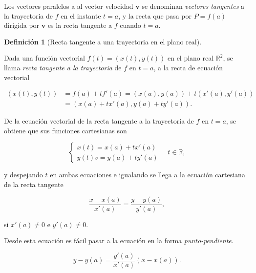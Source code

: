 \documentclass[
  a4paper,
]{scrreport}
\theoremstyle{definition}
\theoremstyle{plain}
\theoremstyle{plain}
\theoremstyle{plain}
\theoremstyle{definition}
\newtheorem{definition}{Definición}[chapter]
\theoremstyle{remark}
\begin{document}
Los vectores paralelos a al vector velocidad \(\mathbf{v}\) se denominan
\emph{vectores tangentes} a la trayectoria de \(f\) en el instante
\(t=a\), y la recta que pasa por \(P=f(a)\) dirigida por \(\mathbf{v}\)
es la recta tangente a \(f\) cuando \(t=a\).

\begin{definition}[Recta tangente a una trayectoria en el plano
real]\protect\hypertarget{def-tangente-trayectoria-plano}{}\label{def-tangente-trayectoria-plano}

Dada una función vectorial \(f(t)=(x(t),y(t))\) en el plano real
\(\mathbb{R}^2\), se llama \emph{recta tangente a la trayectoria} de
\(f\) en \(t=a\), a la recta de ecuación vectorial

\begin{align*}
(x(t),y(t)) 
&= f(a)+tf'(a) = (x(a),y(a))+t(x'(a),y'(a)) \\
& = (x(a)+tx'(a),y(a)+ty'(a)).
\end{align*}

\end{definition}

De la ecuación vectorial de la recta tangente a la trayectoria de \(f\)
en \(t=a\), se obtiene que sus funciones cartesianas son

\[
\begin{cases}
x(t) = x(a) + tx'(a) \\
y(t)v= y(a) + ty'(a) 
\end{cases}
\quad t\in \mathbb{R},
\]

y despejando \(t\) en ambas ecuaciones e igualando se llega a la
ecuación cartesiana de la recta tangente

\[
\frac{x-x(a)}{x'(a)}=\frac{y-y(a)}{y'(a)},
\]

si \(x'(a)\neq 0\) e \(y'(a)\neq 0\).

Desde esta ecuación es fácil pasar a la ecuación en la forma
\emph{punto-pendiente}.

\[
y-y(a)=\frac{y'(a)}{x'(a)}(x-x(a)).
\]
\end{document}
